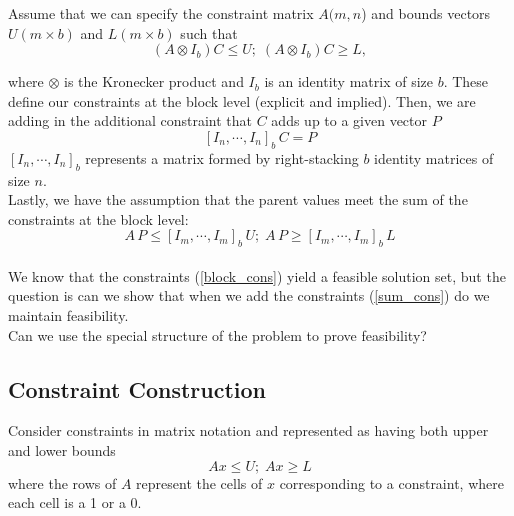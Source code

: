 \documentclass[12pt]{amsart}
\newcommand{\noi}{\noindent}
\begin{document}
Assume that we can specify the constraint matrix $A (m, n$) and bounds vectors $U (m \times b)$ and $L (m \times b)$ such that 
\begin{equation}
(A  \otimes I_b) C \le U ; \;
 (A  \otimes I_b) C \ge L, \label{block_cons}
\end{equation}

\noi where $\otimes$ is the Kronecker product and $I_b$ is an identity matrix of size $b$. These define our constraints at the block level (explicit and implied). Then, we are adding in the additional constraint that $C$ adds up to a given vector $P$
\begin{equation} \label{sum_cons}
 [I_n, \cdots, I_n]_b \, C = P 
\end{equation}
\noi $[I_n, \cdots, I_n]_b$ represents a matrix formed by right-stacking $b$ identity matrices of size $n$.\\  

\noi Lastly, we have the assumption that the parent values meet the sum of the constraints at the block level: 
\begin{equation}
A\, P \le [I_m, \cdots, I_m]_b \, U ; \;  A\, P \ge [I_m, \cdots, I_m]_b \, L
\end{equation}
\\
\noi We know that the constraints (\ref{block_cons}) yield a feasible solution set, but the question is can  we show that when we add the constraints (\ref{sum_cons}) do we maintain feasibility.\\

\noi Can we use the special structure of the problem to prove feasibility?

\subsection{Constraint Construction}

Consider constraints in matrix notation and represented as having both upper and lower bounds
$$ A x \le U ; \; Ax \ge L $$
\noi where the rows of $A$ represent the cells of $x$ corresponding to a constraint, where each cell is a 1 or a 0.\\
\end{document}
